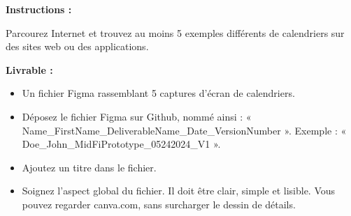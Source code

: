\makeheaderfiles

\textbf{Instructions :}

Parcourez Internet et trouvez au moins 5 exemples différents de calendriers sur des sites web ou des applications.

\textbf{Livrable :}

\begin{itemize}
\item Un fichier Figma rassemblant 5 captures d'écran de calendriers.
\item Déposez le fichier Figma sur Github, nommé ainsi : « Name\_FirstName\_DeliverableName\_Date\_VersionNumber ». Exemple : « Doe\_John\_MidFiPrototype\_05242024\_V1 ».
\item Ajoutez un titre dans le fichier.
\item Soignez l'aspect global du fichier. Il doit être clair, simple et lisible. Vous pouvez regarder canva.com, sans surcharger le dessin de détails.
\end{itemize}


